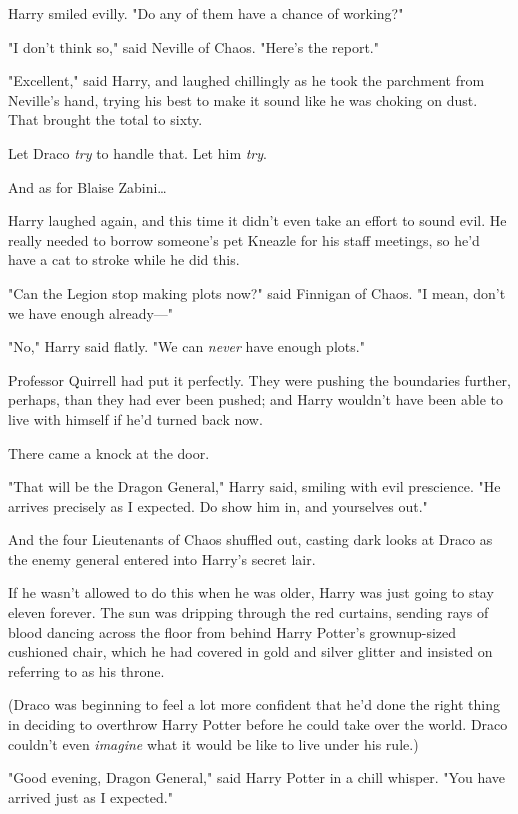Harry smiled evilly. "Do any of them have a chance of working?"

"I don't think so," said Neville of Chaos. "Here's the report."

"Excellent," said Harry, and laughed chillingly as he took the parchment from
Neville's hand, trying his best to make it sound like he was choking on dust.
That brought the total to sixty.

Let Draco \emph{try} to handle that. Let him \emph{try}.

And as for Blaise Zabini…

Harry laughed again, and this time it didn't even take an effort to sound evil.
He really needed to borrow someone's pet Kneazle for his staff meetings, so
he'd have a cat to stroke while he did this.

"Can the Legion stop making plots now?" said Finnigan of Chaos. "I mean, don't
we have enough already---"

"No," Harry said flatly. "We can \emph{never} have enough plots."

Professor Quirrell had put it perfectly. They were pushing the boundaries
further, perhaps, than they had ever been pushed; and Harry wouldn't have been
able to live with himself if he'd turned back now.

There came a knock at the door.

"That will be the Dragon General," Harry said, smiling with evil prescience.
"He arrives precisely as I expected. Do show him in, and yourselves out."

And the four Lieutenants of Chaos shuffled out, casting dark looks at Draco as
the enemy general entered into Harry's secret lair.

If he wasn't allowed to do this when he was older, Harry was just going to stay
eleven forever.
\later
The sun was dripping through the red curtains, sending rays of blood dancing
across the floor from behind Harry Potter's grownup-sized cushioned chair,
which he had covered in gold and silver glitter and insisted on referring to as
his throne.

(Draco was beginning to feel a lot more confident that he'd done the right
thing in deciding to overthrow Harry Potter before he could take over the
world. Draco couldn't even \emph{imagine} what it would be like to live under
his rule.)

"Good evening, Dragon General," said Harry Potter in a chill whisper. "You have
arrived just as I expected."

